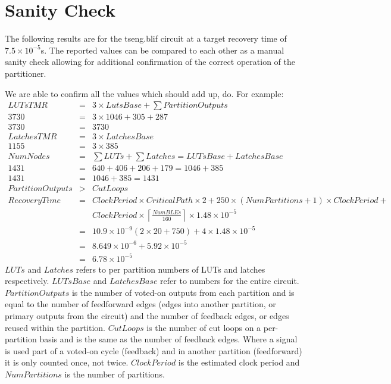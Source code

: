 \documentclass[12pt,final,oneside]{dwThesis} %
\begin{document}



   \section{Sanity Check}
   \label{resSanity} The following results are for the
   tseng.blif circuit at a target recovery time of $7.5\times10^{-5}$s. The reported
   values can be compared to each other as a manual sanity check allowing for
   additional confirmation of the correct operation of the partitioner.

   We are able to confirm all the values which should add up, do. For example:
   \begin{eqnarray*}
      LUTsTMR &=& 3\times LutsBase + \sum PartitionOutputs\\
      3730 &=& 3\times1046 + 305 + 287\\
      3730 &=& 3730\\
      LatchesTMR &=&  3\times LatchesBase\\
      1155 &=& 3\times385\\
      NumNodes &=& \sum LUTs+\sum Latches = LUTsBase+LatchesBase \\
      1431 &=& 640+406+206+179 = 1046+385\\
      1431 &=& 1046 + 385 = 1431\\
      PartitionOutputs &>& CutLoops\\
      RecoveryTime &=&
      ClockPeriod\times CriticalPath\times 2 + 250\times(NumPartitions+1)\times
      ClockPeriod + \\
      & &ClockPeriod\times \left\lceil
      \frac{NumBLEs}{160}\right\rceil\times 1.48\times10^{-5}\\
      &=&
      10.9\times10^{-9}(2\times20+750)+4\times1.48\times10^{-5}\\
      &=&
      8.649\times10^{-6}+5.92\times10^{-5}\\
      &=& 6.78\times10^{-5}
   \end{eqnarray*}
   $LUTs$ and $Latches$ refers to per partition numbers of \glspl{LUT} and latches respectively. $LUTsBase$ and $LatchesBase$ refer to numbers for the entire circuit.
   $PartitionOutputs$ is the number of voted-on outputs from each partition and is equal to the number of feedforward edges (edges into another partition, or primary outputs from the circuit) and the number of feedback edges, or edges reused within the partition. $CutLoops$ is the number of cut loops on a per-partition basis and is the same as the number of feedback edges. Where a signal is used part of a voted-on cycle (feedback) and in another partition (feedforward) it is only counted once, not twice.
   $ClockPeriod$ is the estimated clock period and $NumPartitions$ is the number of partitions.
   
\end{document}
